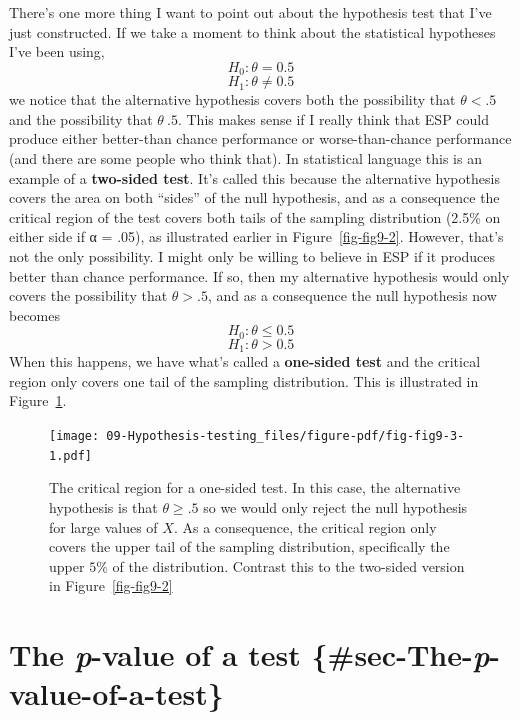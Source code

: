 \documentclass[
  a4paper,
]{book}
\begin{document}
There's one more thing I want to point out about the hypothesis test
that I've just constructed. If we take a moment to think about the
statistical hypotheses I've been using, \[H_0: \theta=0.5\]
\[H_1:\theta \neq 0.5\] we notice that the alternative hypothesis covers
both the possibility that \(\theta < .5\) and the possibility that
\(\theta \> .5.\) This makes sense if I really think that ESP could
produce either better-than chance performance or worse-than-chance
performance (and there are some people who think that). In statistical
language this is an example of a \textbf{two-sided test}. It's called
this because the alternative hypothesis covers the area on both
``sides'' of the null hypothesis, and as a consequence the critical
region of the test covers both tails of the sampling distribution (2.5\%
on either side if α = .05), as illustrated earlier in
Figure~\ref{fig-fig9-2}. However, that's not the only possibility. I
might only be willing to believe in ESP if it produces better than
chance performance. If so, then my alternative hypothesis would only
covers the possibility that \(\theta > .5\), and as a consequence the
null hypothesis now becomes \[H_0: \theta \leq 0.5\]
\[H_1: \theta > 0.5\] When this happens, we have what's called a
\textbf{one-sided test} and the critical region only covers one tail of
the sampling distribution. This is illustrated in
Figure~\ref{fig-fig9-3}.

\begin{figure}

\texttt{[image: 09-Hypothesis-testing\_files/figure-pdf/fig-fig9-3-1.pdf]} \hfill{}

\caption{\label{fig-fig9-3}The critical region for a one-sided test. In
this case, the alternative hypothesis is that \(\theta \geq .5\) so we
would only reject the null hypothesis for large values of \(X\). As a
consequence, the critical region only covers the upper tail of the
sampling distribution, specifically the upper \(5\%\) of the
distribution. Contrast this to the two-sided version in
Figure~\ref{fig-fig9-2}}

\end{figure}

\hypertarget{the-p-value-of-a-test-sec-the-p-value-of-a-test}{%
\section{\texorpdfstring{The \emph{p}-value of a test
\{\#sec-The-\emph{p}-value-of-a-test\}}{The p-value of a test \{\#sec-The-p-value-of-a-test\}}}\label{the-p-value-of-a-test-sec-the-p-value-of-a-test}}
\end{document}
